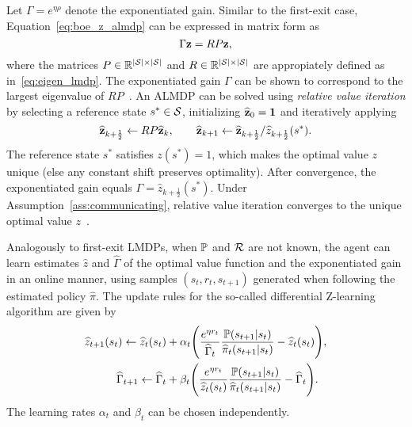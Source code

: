 Let $\Gamma=e^{\eta\rho}$ denote the exponentiated gain. Similar to the first-exit case, Equation~\eqref{eq:boe_z_almdp} can be expressed in matrix form as
\begin{equation}\label{eq:rel_opt}
  \Gamma {\bf z} = R P {\bf z},
\end{equation}
where the matrices $P\in \mathbb{R}^{\lvert\mathcal{S}\rvert\times\lvert\mathcal{S}\rvert}$ and $R\in \mathbb{R}^{\lvert\mathcal{S}\rvert\times\lvert\mathcal{S}\rvert}$ are appropiately defined as in~\eqref{eq:eigen_lmdp}. The exponentiated gain $\Gamma$ can be shown to correspond to the largest eigenvalue of $RP$~\citep{Todorov2009}.
An ALMDP can be solved using {\em relative value iteration} by selecting a reference state $s^*\in\mathcal{S}$, initializing $\widehat{\bf z}_0={\bf 1}$ and iteratively applying
\begin{equation*}
  \widehat{\bf z}_{k+\frac 1 2} \gets R P \widehat{\bf z}_k, \quad \quad \widehat{\bf z}_{k+1} \gets \widehat{\bf z}_{k+\frac 1 2} / \widehat z_{k+\frac 1 2}(s^*).
\end{equation*}
The reference state $s^*$ satisfies $z(s^*)=1$, which makes the optimal value $z$ unique (else any constant shift preserves optimality). After convergence, the exponentiated gain equals $\Gamma=\widehat z_{k+\frac 1 2}(s^*)$. Under Assumption~\ref{ass:communicating}, relative value iteration converges to the unique optimal value $z$~\citep{Todorov2009}.

Analogously to first-exit LMDPs, when $\mathbb{P}$ and $\mathcal{R}$ are not known, the agent can learn estimates $\widehat z$ and $\widehat\Gamma$ of the optimal value function and the exponentiated gain in an online manner, using samples $(s_t, r_t, s_{t+1})$ generated when following the estimated policy $\widehat\pi$. The update rules for the so-called differential Z-learning algorithm are given by
\begin{align}
  \widehat{z}_{t+1}(s_t)  \gets \widehat{z}_{t}(s_{t}) & + \alpha_t \Bigg(\frac{e^{\eta r_t}}{\widehat\Gamma_t}\dfrac{\kernel(s_{t+1}\lvert s_t)}{\widehat\pi_t(s_{t+1}\lvert s_t)}  - \widehat z_t(s_t)\Bigg),\label{eq:diff_update_z}  \\   %
  \widehat\Gamma_{t+1}    \gets \widehat\Gamma_t       & + \beta_t \Bigg(\frac{e^{\eta r_t}}{\widehat z_t(s_t)}\dfrac{\kernel(s_{t+1}\lvert s_t)}{\widehat\pi_t(s_{t+1}\lvert s_t)}  - \widehat \Gamma_t\Bigg).\label{eq:diff_update_gamma}
\end{align}
The learning rates $\alpha_t$ and $\beta_t$ can be chosen independently.

